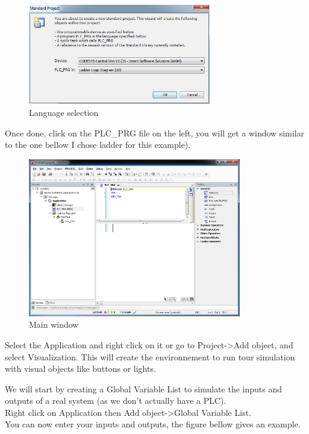 \documentclass[10pt,a4paper]{article}
\begin{document}
\begin{figure}[h!]
	\begin{center}
		\includegraphics[width=300px]{img3.PNG}
	\end{center}
\caption{Language selection}
\label{fig:select}
\end{figure}

Once done, click on the PLC\_PRG file on the left, you will get a window similar to the one bellow I chose ladder for this example).

\begin{figure}[h!]
	\begin{center}
		\includegraphics[width=350px]{img4.PNG}
	\end{center}
\caption{Main window}
\label{fig:main}
\end{figure}

Select the Application and right click on it or go to Project->Add object, and select Visualization.
This will create the environnement to run tour simulation with visual objects like buttons or lights.

We will start by creating a Global Variable List to simulate the inputs and outputs of a real system (as we don't actually have a PLC).\\
Right click on Application then Add object->Global Variable List.\\

You can now enter your inputs and outputs, the figure bellow gives an example.
\end{document}
